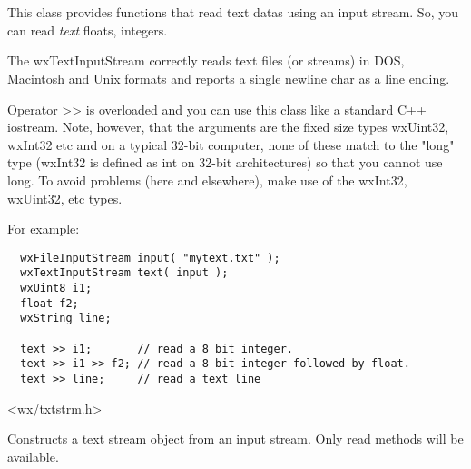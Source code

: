 \section{}\label{wxtextinputstream}

This class provides functions that read text datas using an input stream.
So, you can read {\it text} floats, integers.

The wxTextInputStream correctly reads text files (or streams) in DOS, Macintosh
and Unix formats and reports a single newline char as a line ending.

Operator >> is overloaded and you can use this class like a standard C++ iostream.
Note, however, that the arguments are the fixed size types wxUint32, wxInt32 etc
and on a typical 32-bit computer, none of these match to the "long" type (wxInt32
is defined as int on 32-bit architectures) so that you cannot use long. To avoid
problems (here and elsewhere), make use of the wxInt32, wxUint32, etc types.

For example:
\begin{verbatim}
  wxFileInputStream input( "mytext.txt" );
  wxTextInputStream text( input );
  wxUint8 i1;
  float f2;
  wxString line;

  text >> i1;       // read a 8 bit integer.
  text >> i1 >> f2; // read a 8 bit integer followed by float.
  text >> line;     // read a text line
\end{verbatim}


<wx/txtstrm.h>


\label{wxtextinputstreamconstr}


Constructs a text stream object from an input stream. Only read methods will
be available.





